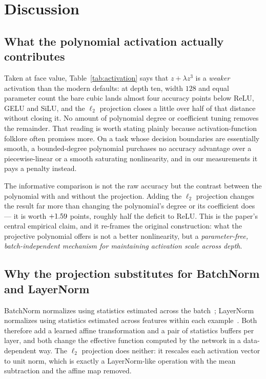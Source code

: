 \section{Discussion}
\label{sec:discussion}

\subsection{What the polynomial activation actually contributes}

Taken at face value, Table~\ref{tab:activation} says that $z + \lambda z^{3}$
is a \emph{weaker} activation than the modern defaults: at depth ten, width
$128$ and equal parameter count the bare cubic lands almost four accuracy
points below ReLU, GELU and SiLU, and the $\ell_2$ projection closes a little
over half of that distance without closing it. No amount of polynomial degree
or coefficient tuning removes the remainder. That reading is worth stating
plainly because activation-function
folklore often promises more. On a task whose decision boundaries are
essentially smooth, a bounded-degree polynomial purchases no accuracy advantage
over a piecewise-linear or a smooth saturating nonlinearity, and in our
measurements it pays a penalty instead.

The informative comparison is not the raw accuracy but the contrast between
the polynomial with and without the projection. Adding the $\ell_2$ projection
changes the result far more than changing the polynomial's degree or its
coefficient does --- it is worth $+1.59$ points, roughly half the deficit to
ReLU. This is the paper's central empirical claim, and it re-frames the
original construction: what the projective polynomial offers is not a better
nonlinearity, but a \emph{parameter-free, batch-independent mechanism for
maintaining activation scale across depth}.

\subsection{Why the projection substitutes for BatchNorm and LayerNorm}

BatchNorm normalizes using statistics estimated across the
batch~\citep{ioffe2015batch};
LayerNorm normalizes using statistics estimated across features within each
example~\citep{ba2016layer}. Both therefore add a learned affine
transformation and a pair of
statistics buffers per layer, and both change the effective function computed
by the network in a data-dependent way. The $\ell_2$ projection does neither:
it rescales each activation vector to unit norm, which is exactly a
LayerNorm-like operation with the mean subtraction and the affine map removed.


